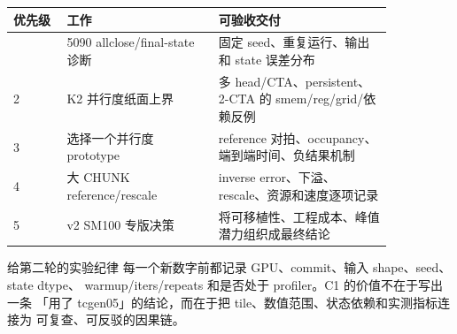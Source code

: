 \documentclass[11pt,a4paper,fontset=none]{ctexart}
\begin{document}
\begin{longtable}{@{}L{0.12\linewidth}L{0.34\linewidth}L{0.39\linewidth}@{}}
\toprule
优先级 & 工作 & 可验收交付 \\
\midrule
\endhead
\bottomrule
{} & 5090 allclose/final-state 诊断 & 固定 seed、重复运行、输出和 state 误差分布 \\
2 & K2 并行度纸面上界 & 多 head/CTA、persistent、2-CTA 的 smem/reg/grid/依赖反例 \\
3 & 选择一个并行度 prototype & reference 对拍、occupancy、端到端时间、负结果机制 \\
4 & 大 CHUNK reference/rescale & inverse error、下溢、rescale、资源和速度逐项记录 \\
5 & v2 SM100 专版决策 & 将可移植性、工程成本、峰值潜力组织成最终结论 \\
\end{longtable}

\begin{record}{给第二轮的实验纪律}
每一个新数字前都记录 GPU、commit、输入 shape、seed、state dtype、
warmup/iters/repeats 和是否处于 profiler。C1 的价值不在于写出一条
「用了 tcgen05」的结论，而在于把 tile、数值范围、状态依赖和实测指标连接为
可复查、可反驳的因果链。
\end{record}
\end{document}
